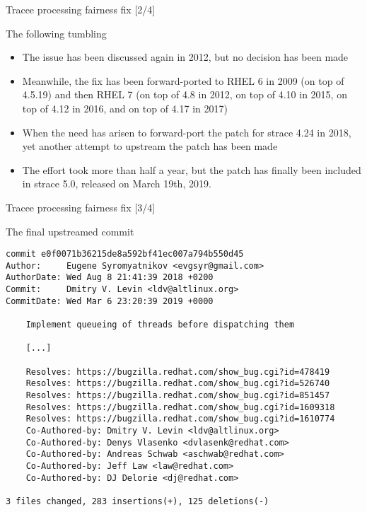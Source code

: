 \documentclass[unicode]{beamer}
\begin{document}
\begin{frame}{Tracee processing fairness fix \hfill [2/4]}
\begin{block}{\large The following tumbling}
\begin{itemize}
  \item The issue has been discussed again in 2012\footnotemark[1],
        but no decision has been made
  \item Meanwhile, the fix has been forward-ported to RHEL 6
        in 2009 (on top of 4.5.19) and then RHEL 7 (on top of 4.8 in 2012,
        on top of 4.10 in 2015, on top of 4.12 in 2016, and on top of 4.17
        in 2017)
  \item When the need has arisen to forward-port the patch for strace 4.24
        in 2018, yet another attempt to upstream the patch has been made
  \item The effort took more than half a year, but the patch has finally
        been included in strace 5.0, released on March 19th, 2019.
\end{itemize}
\end{block}
\end{frame}

\begin{frame}[fragile]{Tracee processing fairness fix \hfill [3/4]}
\begin{block}{\large The final upstreamed commit}
\begin{scriptsize}
\begin{verbatim}
commit e0f0071b36215de8a592bf41ec007a794b550d45
Author:     Eugene Syromyatnikov <evgsyr@gmail.com>
AuthorDate: Wed Aug 8 21:41:39 2018 +0200
Commit:     Dmitry V. Levin <ldv@altlinux.org>
CommitDate: Wed Mar 6 23:20:39 2019 +0000

    Implement queueing of threads before dispatching them
    
    [...]
    
    Resolves: https://bugzilla.redhat.com/show_bug.cgi?id=478419
    Resolves: https://bugzilla.redhat.com/show_bug.cgi?id=526740
    Resolves: https://bugzilla.redhat.com/show_bug.cgi?id=851457
    Resolves: https://bugzilla.redhat.com/show_bug.cgi?id=1609318
    Resolves: https://bugzilla.redhat.com/show_bug.cgi?id=1610774
    Co-Authored-by: Dmitry V. Levin <ldv@altlinux.org>
    Co-Authored-by: Denys Vlasenko <dvlasenk@redhat.com>
    Co-Authored-by: Andreas Schwab <aschwab@redhat.com>
    Co-Authored-by: Jeff Law <law@redhat.com>
    Co-Authored-by: DJ Delorie <dj@redhat.com>

3 files changed, 283 insertions(+), 125 deletions(-)
\end{verbatim}
\end{scriptsize}
\end{block}
\end{frame}
\end{document}
